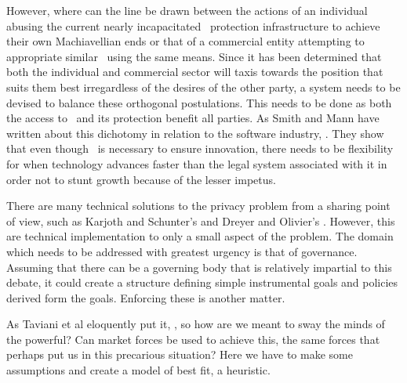 However, where can the line be drawn between the actions of an individual abusing the current nearly incapacitated \IP\ protection infrastructure to achieve their own Machiavellian ends or that of a commercial entity attempting to appropriate similar \IP\ using the same means. Since it has been determined that both the individual and commercial sector will taxis towards the position that suits them best irregardless of the desires of the other party, a system needs to be devised to balance these orthogonal postulations. This needs to be done as both the access to \IP\ and its protection benefit all parties. As Smith and Mann have written about this dichotomy in relation to the software industry, . They show that even though \IP\ is necessary to ensure innovation, there needs to be flexibility for when technology advances faster than the legal system associated with it in order not to stunt growth because of the lesser impetus.

There are many technical solutions to the privacy problem from a sharing point of view, such as Karjoth and Schunter's  and Dreyer and Olivier's . However, this are technical implementation to only a small aspect of the problem. The domain which needs to be addressed with greatest urgency is that of governance. Assuming that there can be a governing body that is relatively impartial to this debate, it could create a structure defining simple instrumental goals and policies derived form the goals. Enforcing these is another matter.

As Taviani et al eloquently put it, , so how are we meant to sway the minds of the powerful? Can market forces be used to achieve this, the same forces that perhaps put us in this precarious situation? Here we have to make some assumptions and create a model of best fit, a heuristic.

